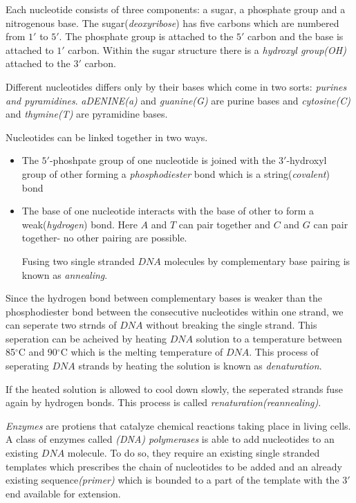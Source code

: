 Each nucleotide consists of three components: a sugar, a phosphate group and a nitrogenous base. The sugar(\emph{deoxyribose}) has five carbons
 which are numbered from $1'$ to $5'$. The phosphate group is attached to the $5'$ carbon and the base is attached to $1'$ carbon. Within the sugar
structure there is a \emph{hydroxyl group(OH)} attached to the $3'$ carbon.

Different nucleotides differs only by their bases which come in two sorts: \emph{purines and pyramidines}. \emph{aDENINE(a)} and \emph{guanine(G)}
are purine bases and \emph{cytosine(C)} and \emph{thymine(T)} are pyramidine bases.

Nucleotides can be linked together in two ways.
\begin{itemize}
	\item The $5'$-phoshpate group of one nucleotide is joined with the $3'$-hydroxyl group of other forming a \emph{phosphodiester} bond
		which is a string(\emph{covalent}) bond
	\item The base of one nucleotide interacts with the base of other to form a weak(\emph{hydrogen}) bond. Here $A$ and $T$ can pair together
		and $C$ and $G$ can pair together- no other pairing are possible.

		Fusing two single stranded $DNA$ molecules by complementary base pairing is known as \emph{annealing}.
\end{itemize}

Since the hydrogen bond between complementary bases is weaker than the phosphodiester bond between the consecutive nucleotides within one strand, 
we can seperate two strnds of $DNA$ without breaking the single strand. This seperation can be acheived by heating $DNA$ solution to a temperature
between 85$^\circ$C and 90$^\circ$C which is the melting temperature of $DNA$. This process of seperating $DNA$ strands by heating the solution is 
known as \emph{denaturation}.

If the heated solution is allowed to cool down slowly, the seperated strands fuse again by hydrogen bonds. This process is called 
\emph{renaturation(reannealing)}.

\emph{Enzymes} are protiens that catalyze chemical reactions taking place in living cells. A class of enzymes called \emph{(DNA) polymerases} is 
able to add nucleotides to an existing $DNA$ molecule. To do so, they require an existing single stranded templates which prescribes the chain of 
nucleotides to be added and an already existing sequence\emph{(primer)} which is bounded to a part of the template with the $3'$ end available for
extension.


